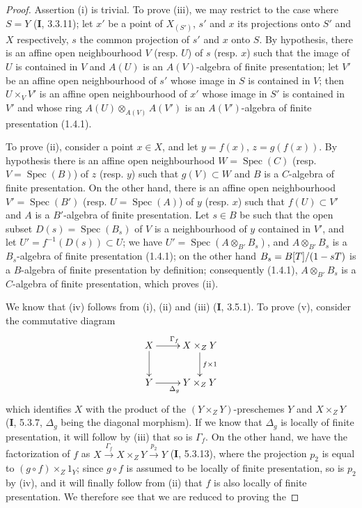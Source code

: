 \begin{proof}
Assertion (i) is trivial. To prove (iii), we may restrict to the case
where $S=Y$ (\textbf{I}, 3.3.11); let $x'$ be a point of $X_{(S')}$, $s'$ and $x$ its
projections onto $S'$ and $X$ respectively, $s$ the common projection of $s'$
and $x$ onto $S$. By hypothesis, there is an affine open neighbourhood $V$
(resp. $U$) of $s$ (resp. $x$) such that the image of $U$ is contained in $V$
and $A(U)$ is an $A(V)$-algebra of finite presentation; let $V'$ be an affine
open neighbourhood of $s'$ whose image in $S$ is contained in $V$; then
$U\times_VV'$ is an affine open neighbourhood of $x'$ whose image in $S'$
is contained in $V'$ and whose ring $A(U)\otimes_{A(V)}A(V')$ is an
$A(V')$-algebra of finite presentation (1.4.1).

To prove (ii), consider a point $x\in X$, and let $y=f(x)$,
$z=g(f(x))$. By hypothesis there is an affine open neighbourhood $W=\operatorname{Spec}(C)$
(resp. $V=\operatorname{Spec}(B)$) of $z$ (resp. $y$) such that $g(V)\subset W$ and $B$
is a $C$-algebra of finite presentation. On the other hand, there is an affine
open neighbourhood $V'=\operatorname{Spec}(B')$ (resp. $U=\operatorname{Spec}(A)$) of $y$ (resp. $x$) such that
$f(U)\subset V'$ and $A$ is a $B'$-algebra of finite presentation. Let
$s\in B$ be such that the open subset $D(s)=\operatorname{Spec}(B_s)$ of $V$ is a neighbourhood of $y$
contained in $V'$, and let $U'=f^{-1}(D(s))\subset U$; we have
$U'=\operatorname{Spec}(A\otimes_{B'}B_s)$, and $A\otimes_{B'}B_s$ is a $B_s$-algebra of
finite presentation (1.4.1); on the other hand $B_s=B[T]/(1- sT)$ is a
$B$-algebra of finite presentation by definition; consequently (1.4.1),
$A\otimes_{B'}B_s$ is a $C$-algebra of finite presentation, which proves
(ii).

We know that (iv) follows from (i), (ii) and (iii) (\textbf{I}, 3.5.1). To prove (v),
consider the commutative diagram
\[
\xymatrix{
X \ar[r]^{\Gamma_f} \ar[d] & X\times_ZY \ar[d]^{f\times 1} \\
Y \ar[r]_{\Delta_g} & Y\times_ZY
}
\]
which identifies $X$ with the product of the $(Y\times_ZY)$-preschemes $Y$ and
$X\times_ZY$ (\textbf{I}, 5.3.7, $\Delta_g$ being the diagonal morphism). If we know
that $\Delta_g$ is locally of finite presentation, it will follow by
(iii) that so is $\Gamma_f$. On the other hand, we have the factorization
of $f$ as
$X\xrightarrow{\Gamma_f}X\times_ZY\xrightarrow{p_2}Y$ (\textbf{I}, 5.3.13), where the
projection $p_2$ is equal to $(g\circ f)\times_Z1_Y$; since $g\circ f$ is
assumed to be locally of finite presentation, so is $p_2$ by
(iv), and it will finally follow from (ii) that $f$ is also locally of
finite presentation. We therefore see that we are reduced to proving the
\end{proof}

